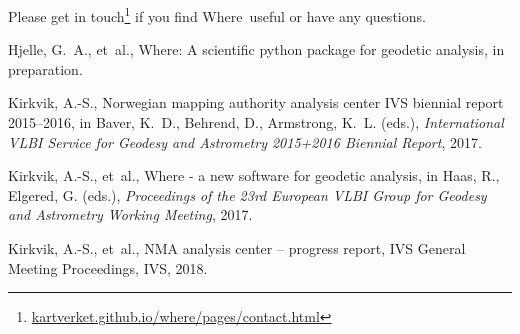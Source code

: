 \documentclass[twocolumn,twoside]{svmultivs_gm} %
\newcommand{\where}{\textsf{Where}}
\begin{document}
Please get in touch\footnote{\url{kartverket.github.io/where/pages/contact.html}} if you find \where\ useful or have any questions.
%
\begin{thebibliography}{99}

Hjelle, G.~A., et~al., Where: A scientific python package for geodetic
  analysis, in preparation.

Kirkvik, A.-S., Norwegian mapping authority analysis center {IVS} biennial
  report 2015--2016, in Baver, K.~D., Behrend, D., Armstrong, K.~L. (eds.),
  \emph{International VLBI Service for Geodesy and Astrometry 2015+2016
  Biennial Report}, 2017.

Kirkvik, A.-S., et~al., Where - a new software for geodetic analysis, in Haas,
  R., Elgered, G. (eds.), \emph{Proceedings of the 23rd European VLBI Group for
  Geodesy and Astrometry Working Meeting}, 2017.

Kirkvik, A.-S., et~al., {NMA} analysis center -- progress report, IVS General
  Meeting Proceedings, IVS, 2018.

\end{thebibliography}
\end{document}
